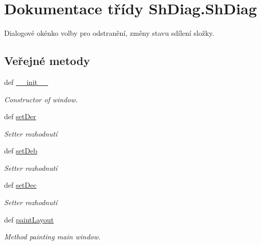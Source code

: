 \hypertarget{classShDiag_1_1ShDiag}{\section{Dokumentace třídy Sh\-Diag.\-Sh\-Diag}
\label{db/d2a/classShDiag_1_1ShDiag}
}


Dialogové okénko volby pro odstranění, změny stavu sdílení složky.  


\subsection*{Veřejné metody}
\begin{DoxyCompactItemize}
\item 
def \hyperlink{classShDiag_1_1ShDiag_a0b4088eeadf4cfd2038bb34d2148308c}{\-\_\-\-\_\-init\-\_\-\-\_\-}
\begin{DoxyCompactList}\small\item\em Constructor of window. \end{DoxyCompactList}\item 
def \hyperlink{classShDiag_1_1ShDiag_a9e6e524803b2f1fbfe42051601ad1297}{set\-Der}
\begin{DoxyCompactList}\small\item\em Setter rozhodnutí \end{DoxyCompactList}\item 
def \hyperlink{classShDiag_1_1ShDiag_a5803da989606f48cf128980d2d35dd38}{set\-Deb}
\begin{DoxyCompactList}\small\item\em Setter rozhodnutí \end{DoxyCompactList}\item 
def \hyperlink{classShDiag_1_1ShDiag_ad9440dec4d43d0979084fe96e17f7508}{set\-Dec}
\begin{DoxyCompactList}\small\item\em Setter rozhodnutí \end{DoxyCompactList}\item 
def \hyperlink{classShDiag_1_1ShDiag_a9305f9fabe6f4b3821fdc9a63eaad8dd}{paint\-Layout}
\begin{DoxyCompactList}\small\item\em Method painting main window. \end{DoxyCompactList}\end{DoxyCompactItemize}
